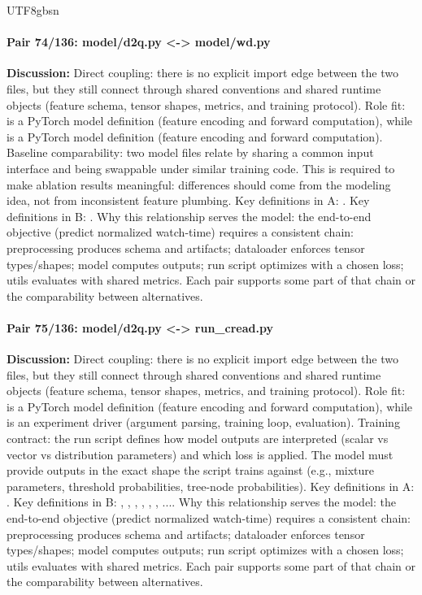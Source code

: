 \documentclass[11pt]{article}
\begin{document}
\begin{CJK*}{UTF8}{gbsn}
\paragraph{Pair 74/136: model/d2q.py <-> model/wd.py}
\textbf{Discussion:} Direct coupling: there is no explicit import edge between the two files, but they still connect through shared conventions and shared runtime objects (feature schema, tensor shapes, metrics, and training protocol). Role fit: \texttt{} is a PyTorch model definition (feature encoding and forward computation), while \texttt{} is a PyTorch model definition (feature encoding and forward computation). Baseline comparability: two model files relate by sharing a common input interface and being swappable under similar training code. This is required to make ablation results meaningful: differences should come from the modeling idea, not from inconsistent feature plumbing. Key definitions in A: \texttt{}. Key definitions in B: \texttt{}. Why this relationship serves the model: the end-to-end objective (predict normalized watch-time) requires a consistent chain: preprocessing produces schema and artifacts; dataloader enforces tensor types/shapes; model computes outputs; run script optimizes with a chosen loss; utils evaluates with shared metrics. Each pair supports some part of that chain or the comparability between alternatives.

\paragraph{Pair 75/136: model/d2q.py <-> run\_cread.py}
\textbf{Discussion:} Direct coupling: there is no explicit import edge between the two files, but they still connect through shared conventions and shared runtime objects (feature schema, tensor shapes, metrics, and training protocol). Role fit: \texttt{} is a PyTorch model definition (feature encoding and forward computation), while \texttt{} is an experiment driver (argument parsing, training loop, evaluation). Training contract: the run script defines how model outputs are interpreted (scalar vs vector vs distribution parameters) and which loss is applied. The model must provide outputs in the exact shape the script trains against (e.g., mixture parameters, threshold probabilities, tree-node probabilities). Key definitions in A: \texttt{}. Key definitions in B: \texttt{}, \texttt{}, \texttt{}, \texttt{}, \texttt{}, \texttt{}, .... Why this relationship serves the model: the end-to-end objective (predict normalized watch-time) requires a consistent chain: preprocessing produces schema and artifacts; dataloader enforces tensor types/shapes; model computes outputs; run script optimizes with a chosen loss; utils evaluates with shared metrics. Each pair supports some part of that chain or the comparability between alternatives.


\end{CJK*}
\end{document}
